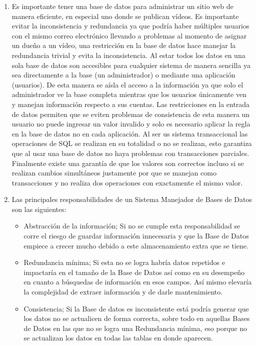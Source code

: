 \documentclass{exam}
\begin{document}
\begin{questions}
\begin{enumerate}[label=\alph*.]
		\item Es importante tener una base de datos para administrar un sitio web de manera eficiente, en especial uno donde se publican vídeos. Es importante evitar la inconsistencia y redundancia ya que podría haber múltiples usuarios con el mismo correo electrónico llevando a problemas al momento de asignar un dueño a un vídeo, una restricción en la base de datos hace manejar la redundancia trivial y evita la inconsistencia. Al estar todos los datos en una sola base de datos son accesibles para cualquier sistema de manera sencilla ya sea directamente a la base (un administrador) o mediante una aplicación (usuarios). De esta manera se aísla el acceso a la información ya que solo el administrador ve la base completa mientras que los usuarios únicamente ven y manejan información respecto a sus cuentas. Las restricciones en la entrada de datos permiten que se eviten problemas de consistencia de esta manera un usuario no puede ingresar un valor invalido y solo es necesario aplicar la regla en la base de datos no en cada aplicación. Al ser us sistema transaccional las operaciones de SQL se realizan en su totalidad o no se realizan, esto garantiza que al usar una base de datos no haya problemas con transacciones parciales. Finalmente existe una garantía de que los valores son correctos incluso si se realizan cambios simultáneos justamente por que se manejan como transacciones y no realiza dos operaciones con exactamente el mismo valor.
		\item Las principales responsabilidades de un Sistema Manejador de Bases de Datos son las siguientes:
		    \begin{itemize}
		        \item Abstracción de la información; Si no se cumple esta responsabilidad se corre el riesgo de guardar información innecesaria y que la Base de Datos empiece a crecer mucho debido a este almacenamiento extra que se tiene.
		        \item Redundancia mínima; Si esta no se logra habría datos repetidos e impactaría en el tamaño de la Base de Datos así como en su desempeño en cuanto a búsquedas de información en esos campos. Así mismo elevaría la complejidad de extraer información y de darle mantenimiento.
		        \item Consistencia; Si la Base de datos es inconsistente está podría generar que los datos no se actualicen de forma correcta, sobre todo en aquellas Bases de Datos en las que no se logra una Redundancia mínima, eso porque no se actualizan los datos en todas las tablas en donde aparecen.

\end{itemize}
\end{enumerate}
\end{questions}
\end{document}
